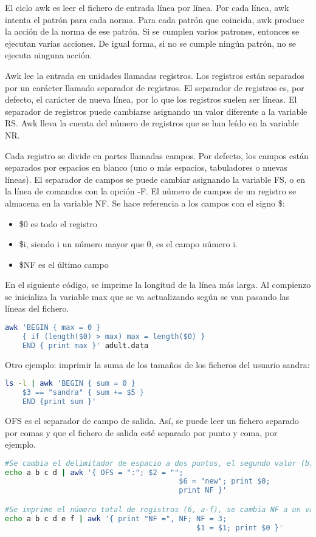 El ciclo awk es leer el fichero de entrada línea por línea. Por cada línea, awk intenta el patrón para cada norma. Para cada patrón que coincida, awk produce la acción de la norma de ese patrón. Si se cumplen varios patrones, entonces se ejecutan varias acciones. De igual forma, si no se cumple ningún patrón, no se ejecuta ninguna acción.

Awk lee la entrada en unidades llamadas registros. Los registros están separados por un carácter llamado separador de registros. El separador de registros es, por defecto, el carácter de nueva línea, por lo que los registros suelen ser líneas. El separador de registros puede cambiarse asignando un valor diferente a la variable RS. Awk lleva la cuenta del número de registros que se han leído en la variable NR. 

Cada registro se divide en partes llamadas campos. Por defecto, los campos están separados por espacios en blanco (uno o más espacios, tabuladores o nuevas líneas). El separador de campos se puede cambiar asignando la variable FS, o en la línea de comandos con la opción -F. El número de campos de un registro se almacena en la variable NF. Se hace referencia a los campos con el signo \$:
\begin{itemize}
\item \$0 es todo el registro
\item \$i, siendo i un número mayor que 0, es el campo número i.
\item \$NF es el último campo
\end{itemize}

En el siguiente código, se imprime la longitud de la línea más larga. Al compienzo se inicializa la variable max que se va actualizando según se van pasando las líneas del fichero.
\begin{lstlisting}[language=bash]
awk 'BEGIN { max = 0 }
	{ if (length($0) > max) max = length($0) }
	END { print max }' adult.data
\end{lstlisting}

Otro ejemplo: imprimir la suma de los tamaños de los ficheros del usuario sandra:
\begin{lstlisting}[language=bash]
ls -l | awk 'BEGIN { sum = 0 } 
	$3 == "sandra" { sum += $5 }
	END {print sum }'
\end{lstlisting}

OFS es el separador de campo de salida. Así, se puede leer un fichero separado por comas y que el fichero de salida esté separado por punto y coma, por ejemplo.
\begin{lstlisting}[language=bash]
#Se cambia el delimitador de espacio a dos puntos, el segundo valor (b) se reemplaza por un string vacío, se crea una sexta variable (nueva) con valor new, se imprime la línea y se imprime el número de registros.
echo a b c d | awk '{ OFS = ":"; $2 = "";
										$6 = "new"; print $0;
										print NF }'

#Se imprime el número total de registros (6, a-f), se cambia NF a un valor de 3 (a-c), se asigna a la variable 1 el valor de la variable 1 y se imprime toda la línea (que como se ha modificado NF a 3, la línea ya no es abcdef, si no solo abc).
echo a b c d e f | awk '{ print "NF =", NF; NF = 3;
											$1 = $1; print $0 }'
\end{lstlisting}